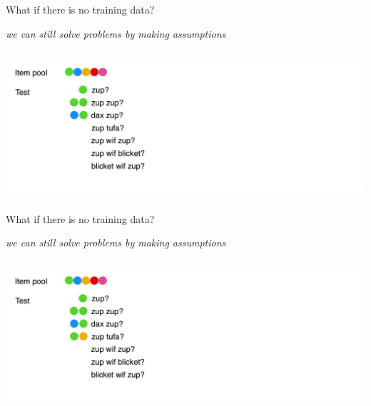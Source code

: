 \documentclass[aspectratio=169,t,handout,xcolor={usenames,dvipsnames}]{beamer}
\begin{document}
\begin{frame}{What if there is no training data?}
\centerline{\textit{we can still solve problems by making assumptions}}
\centering\includegraphics[height=5.5cm]{image/Jietu20220328-191531.jpg}

\end{frame}

\begin{frame}{What if there is no training data?}
\centerline{\textit{we can still solve problems by making assumptions}}
\centering\includegraphics[height=5.5cm]{image/Jietu20220328-192202.jpg}

\end{frame}
\end{document}
